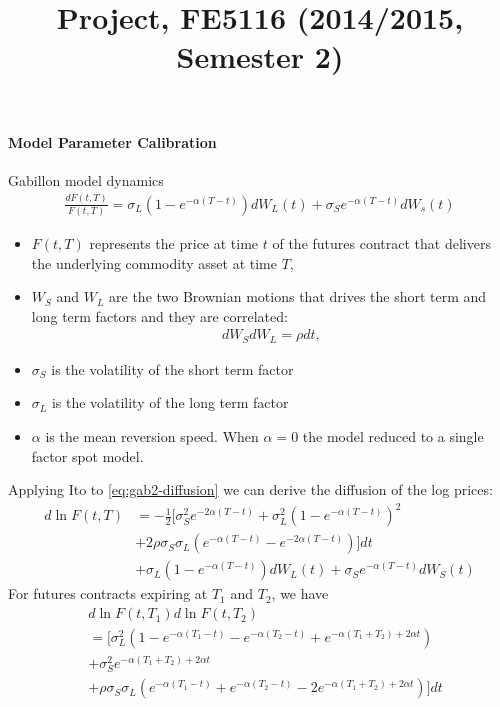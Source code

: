 \documentclass[12pt,a4paper,hidelinks,fleqn]{article}            %
\title{\vspace{-5ex}Project, FE5116 (2014/2015, Semester 2)\vspace{-7ex}}
\date{}
\begin{document}
\maketitle
\paragraph{Model Parameter Calibration}

Gabillon model dynamics
\begin{align}
\frac{dF(t, T)}{F(t, T)} = \sigma_L (1 - e^{-\alpha(T-t)}) dW_L(t) + \sigma_S e^{-\alpha(T-t)} dW_s(t)
\label{eq:gab2-diffusion}
\end{align}
\begin{itemize}
\item $F(t, T)$ represents the price at time $t$ of the futures contract that delivers the underlying commodity asset at time $T$,
\item $W_S$ and $W_L$ are the two Brownian motions that drives the short term and long term factors and they are correlated:
\begin{align*}
dW_S dW_L = \rho dt,
\end{align*}
\item $\sigma_S$ is the volatility of the short term factor
\item $\sigma_L$ is the volatility of the long term factor
\item $\alpha$ is the mean reversion speed. When $\alpha = 0$ the model reduced to a single factor spot model. 
\end{itemize}

Applying Ito to \eqref{eq:gab2-diffusion} we can derive the diffusion of the log prices:
\begin{align*}
d \ln F(t, T) & = - \frac{1}{2}[ \sigma_S^2 e^{-2\alpha(T-t)} + \sigma_L^2(1-e^{-\alpha(T-t)})^2 \\
              & + 2 \rho \sigma_S \sigma_L \left(e^{-\alpha(T-t)} - e^{-2\alpha(T-t)}\right)] dt\\
              & + \sigma_L(1-e^{-\alpha(T-t)}) dW_L(t) 
                + \sigma_S e^{-\alpha(T-t)} dW_S(t)
\end{align*}
For futures contracts expiring at $T_1$ and $T_2$, we have
\begin{align*}
& d\ln F(t, T_1) d\ln F(t, T_2) \\
& = [\sigma_L^2(1-e^{-\alpha(T_1-t)} - e^{-\alpha(T_2-t)} + e^{-\alpha(T_1+T_2)+2\alpha t}) \\
& + \sigma_S^2 e^{-\alpha(T_1+T_2) + 2\alpha t} \\
& +\rho \sigma_S\sigma_L(e^{-\alpha(T_1-t)} + e^{-\alpha(T_2-t)} - 2e^{-\alpha(T_1+T_2)+2\alpha t}) ] dt
\end{align*}
\end{document}
